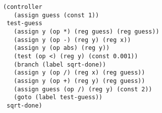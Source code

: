\documentclass[a4paper,12pt]{article}
\begin{document}
\begin{lstlisting}
  (controller
     (assign guess (const 1))
   test-guess
     (assign y (op *) (reg guess) (reg guess))
     (assign y (op -) (reg y) (reg x))
     (assign y (op abs) (reg y))
     (test (op <) (reg y) (const 0.001))
     (branch (label sqrt-done))
     (assign y (op /) (reg x) (reg guess))
     (assign y (op +) (reg y) (reg guess))
     (assign guess (op /) (reg y) (const 2))
     (goto (label test-guess))
   sqrt-done)
\end{lstlisting}
\end{document}
